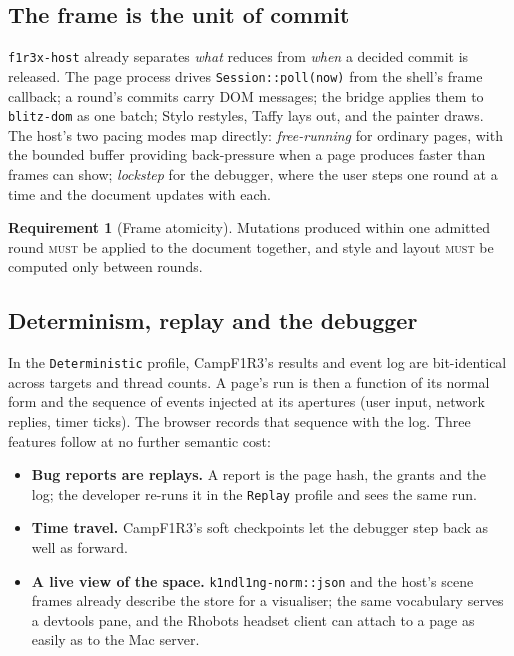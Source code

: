 \documentclass[11pt]{article}
\theoremstyle{definition}
\newtheorem{requirement}{Requirement}
\theoremstyle{remark}
\newcommand{\Camp}{CampF1R3}
\newcommand{\MUST}{\textsc{must}}
\newcommand{\code}[1]{\texttt{#1}}
\begin{document}
\subsection{The frame is the unit of commit}

\code{f1r3x-host} already separates \emph{what} reduces from \emph{when} a decided
commit is released. The page process drives \code{Session::poll(now)} from the shell's
frame callback; a round's commits carry DOM messages; the bridge applies them to
\code{blitz-dom} as one batch; Stylo restyles, Taffy lays out, and the painter
draws. The host's two pacing modes map directly: \emph{free-running} for ordinary
pages, with the bounded buffer providing back-pressure when a page produces faster
than frames can show; \emph{lockstep} for the debugger, where the user steps one round
at a time and the document updates with each.

\begin{requirement}[Frame atomicity]
Mutations produced within one admitted round \MUST{} be applied to the document
together, and style and layout \MUST{} be computed only between rounds.
\end{requirement}

\subsection{Determinism, replay and the debugger}

In the \code{Deterministic} profile, \Camp{}'s results and event log are
bit-identical across targets and thread counts. A page's run is then a function of
its normal form and the sequence of events injected at its apertures (user input,
network replies, timer ticks). The browser records that sequence with the log. Three
features follow at no further semantic cost:

\begin{itemize}[nosep]
\item \textbf{Bug reports are replays.} A report is the page hash, the grants and the
  log; the developer re-runs it in the \code{Replay} profile and sees the same run.
\item \textbf{Time travel.} \Camp{}'s soft checkpoints let the debugger step back as
  well as forward.
\item \textbf{A live view of the space.} \code{k1ndl1ng-norm::json} and the host's
  scene frames already describe the store for a visualiser; the same vocabulary serves
  a devtools pane, and the Rhobots headset client can attach to a page as easily as to
  the Mac server.
\end{itemize}
\end{document}
